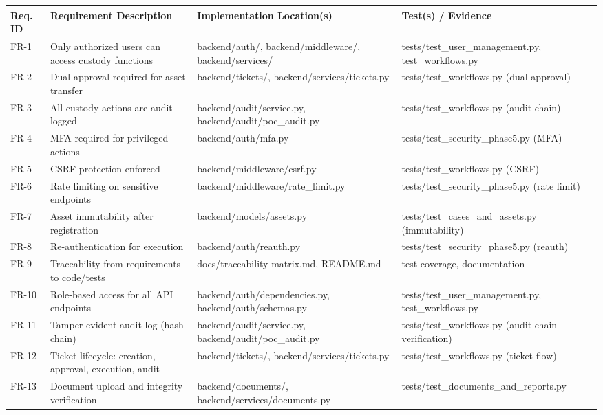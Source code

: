 \documentclass[12pt,a4paper]{report}
\begin{document}
\begin{longtable}{|p{1.2cm}|p{4.5cm}|p{5cm}|p{4.3cm}|}
\hline
\textbf{Req. ID} & \textbf{Requirement Description} & \textbf{Implementation Location(s)} & \textbf{Test(s) / Evidence} \\
\hline
FR-1 & Only authorized users can access custody functions & backend/auth/, backend/middleware/, backend/services/ & tests/test\_user\_management.py, test\_workflows.py \\
\hline
FR-2 & Dual approval required for asset transfer & backend/tickets/, backend/services/tickets.py & tests/test\_workflows.py (dual approval) \\
\hline
FR-3 & All custody actions are audit-logged & backend/audit/service.py, backend/audit/poc\_audit.py & tests/test\_workflows.py (audit chain) \\
\hline
FR-4 & MFA required for privileged actions & backend/auth/mfa.py & tests/test\_security\_phase5.py (MFA) \\
\hline
FR-5 & CSRF protection enforced & backend/middleware/csrf.py & tests/test\_workflows.py (CSRF) \\
\hline
FR-6 & Rate limiting on sensitive endpoints & backend/middleware/rate\_limit.py & tests/test\_security\_phase5.py (rate limit) \\
\hline
FR-7 & Asset immutability after registration & backend/models/assets.py & tests/test\_cases\_and\_assets.py (immutability) \\
\hline
FR-8 & Re-authentication for execution & backend/auth/reauth.py & tests/test\_security\_phase5.py (reauth) \\
\hline
FR-9 & Traceability from requirements to code/tests & docs/traceability-matrix.md, README.md & test coverage, documentation \\
\hline
FR-10 & Role-based access for all API endpoints & backend/auth/dependencies.py, backend/auth/schemas.py & tests/test\_user\_management.py, test\_workflows.py \\
\hline
FR-11 & Tamper-evident audit log (hash chain) & backend/audit/service.py, backend/audit/poc\_audit.py & tests/test\_workflows.py (audit chain verification) \\
\hline
FR-12 & Ticket lifecycle: creation, approval, execution, audit & backend/tickets/, backend/services/tickets.py & tests/test\_workflows.py (ticket flow) \\
\hline
FR-13 & Document upload and integrity verification & backend/documents/, backend/services/documents.py & tests/test\_documents\_and\_reports.py \\

\end{longtable}
\end{document}
